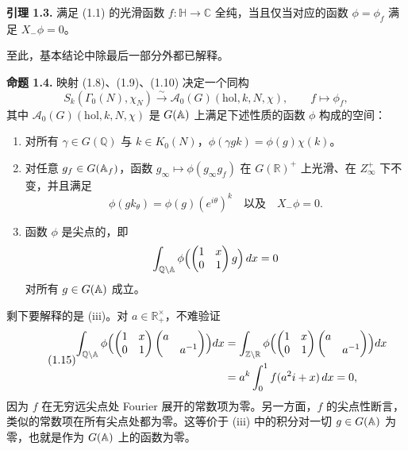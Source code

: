 \medskip\noindent\textbf{引理 1.3.}\quad
满足 (1.1) 的光滑函数 $f:\mathbb{H}\to\mathbb{C}$ 全纯，当且仅当对应的函数 $\phi=\phi_f$ 满足 $X_-\phi=0$。

\medskip
至此，基本结论中除最后一部分外都已解释。

\medskip\noindent\textbf{命题 1.4.}\quad
映射 (1.8)、(1.9)、(1.10) 决定一个同构
\[
S_k(\Gamma_0(N),\chi_N)\overset{\sim}{\longrightarrow}\mathcal{A}_0(G)(\mathrm{hol},k,N,\chi),\qquad f\mapsto\phi_f,
\]
其中 $\mathcal{A}_0(G)(\mathrm{hol},k,N,\chi)$ 是 $G(\mathbb{A})$ 上满足下述性质的函数 $\phi$ 构成的空间：
\begin{enumerate}[label=(\roman*),leftmargin=2.4em,itemsep=0.15em,topsep=0.25em]
\item 对所有 $\gamma\in G(\mathbb{Q})$ 与 $k\in K_0(N)$，$\phi(\gamma gk)=\phi(g)\chi(k)$。
\item 对任意 $g_f\in G(\mathbb{A}_f)$，函数 $g_\infty\mapsto\phi(g_\infty g_f)$ 在 $G(\mathbb{R})^+$ 上光滑、在 $Z_\infty^+$ 下不变，并且满足
\[
\phi(gk_\theta)=\phi(g)(e^{i\theta})^k
\quad\text{以及}\quad
X_-\phi=0.
\]
\item 函数 $\phi$ 是尖点的，即
\[
\int_{\mathbb{Q}\backslash\mathbb{A}}\phi\Bigl(\begin{pmatrix}1&x\\0&1\end{pmatrix}g\Bigr)\,dx=0
\]
对所有 $g\in G(\mathbb{A})$ 成立。
\end{enumerate}

\medskip
剩下要解释的是 (iii)。对 $a\in\mathbb{R}^\times_+$，不难验证
\begin{equation*}\tag{1.15}
\begin{aligned}
\int_{\mathbb{Q}\backslash\mathbb{A}}\phi\Bigl(\begin{pmatrix}1&x\\0&1\end{pmatrix}\begin{pmatrix}a&\\&a^{-1}\end{pmatrix}\Bigr)dx
&=\int_{\mathbb{Z}\backslash\mathbb{R}}\phi\Bigl(\begin{pmatrix}1&x\\0&1\end{pmatrix}\begin{pmatrix}a&\\&a^{-1}\end{pmatrix}\Bigr)dx\\
&=a^k\int_0^1f(a^2i+x)\,dx=0,
\end{aligned}
\end{equation*}
因为 $f$ 在无穷远尖点处 Fourier 展开的常数项为零。另一方面，$f$ 的尖点性断言，类似的常数项在所有尖点处都为零。这等价于 (iii) 中的积分对一切 $g\in G(\mathbb{A})$ 为零，也就是作为 $G(\mathbb{A})$ 上的函数为零。


